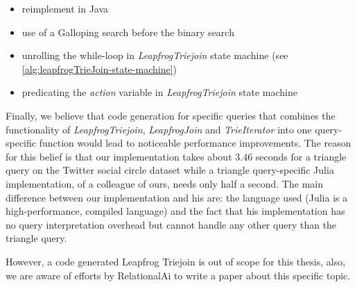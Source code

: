 \begin{itemize}
    \item reimplement in Java
    \item use of a Galloping search before the binary search
    \item unrolling the while-loop in \textit{LeapfrogTriejoin} state machine (see \cref{alg:leapfrogTrieJoin-state-machine})
    \item predicating the \textit{action} variable in \textit{LeapfrogTriejoin} state machine
\end{itemize}

Finally, we believe that code generation for specific queries that combines the functionality of \textit{LeapfrogTriejoin}, \textit{LeapfrogJoin}
and \textit{TrieIterator} into one query-specific function would lead to noticeable performance improvements.
The reason for this belief is that our implementation takes about 3.46 seconds for a triangle query on the Twitter social circle dataset
while a triangle query-specific Julia implementation, of a colleague of ours, needs only half a second.
The main difference between our implementation and his are: the language used (Julia is a high-performance, compiled language) and the fact
that his implementation has no query interpretation overhead but cannot handle any other query than the triangle query.

However, a code generated Leapfrog Triejoin is out of scope for this thesis, also, we are aware of efforts by RelationalAi to
write a paper about this specific topic.




